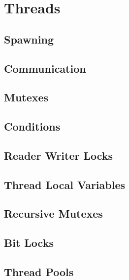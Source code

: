 \chapter{Threads}
\section{Spawning}
\section{Communication}
\section{Mutexes}
\section{Conditions}
\section{Reader Writer Locks}
\section{Thread Local Variables}
\section{Recursive Mutexes}
\section{Bit Locks}
\section{Thread Pools}

